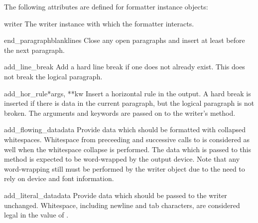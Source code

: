 The following attributes are defined for formatter instance objects:


\begin{memberdesc}[formatter]{writer}
The writer instance with which the formatter interacts.
\end{memberdesc}


\begin{methoddesc}[formatter]{end_paragraph}{blanklines}
Close any open paragraphs and insert at least 
before the next paragraph.
\end{methoddesc}

\begin{methoddesc}[formatter]{add_line_break}{}
Add a hard line break if one does not already exist.  This does not
break the logical paragraph.
\end{methoddesc}

\begin{methoddesc}[formatter]{add_hor_rule}{*args, **kw}
Insert a horizontal rule in the output.  A hard break is inserted if
there is data in the current paragraph, but the logical paragraph is
not broken.  The arguments and keywords are passed on to the writer's
 method.
\end{methoddesc}

\begin{methoddesc}[formatter]{add_flowing_data}{data}
Provide data which should be formatted with collapsed whitespaces.
Whitespace from preceeding and successive calls to
 is considered as well when the whitespace
collapse is performed.  The data which is passed to this method is
expected to be word-wrapped by the output device.  Note that any
word-wrapping still must be performed by the writer object due to the
need to rely on device and font information.
\end{methoddesc}

\begin{methoddesc}[formatter]{add_literal_data}{data}
Provide data which should be passed to the writer unchanged.
Whitespace, including newline and tab characters, are considered legal
in the value of .  
\end{methoddesc}

